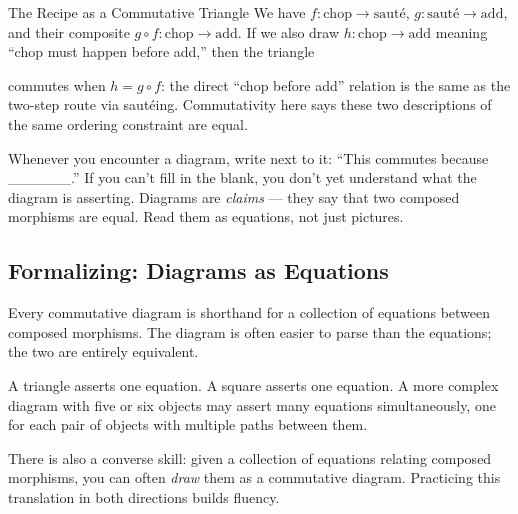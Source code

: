 \begin{example}{The Recipe as a Commutative Triangle}
We have $f : \text{chop} \to \text{sauté}$, $g : \text{sauté} \to \text{add}$,
and their composite $g \circ f : \text{chop} \to \text{add}$. If we also draw
$h : \text{chop} \to \text{add}$ meaning ``chop must happen before add,'' then
the triangle

\medskip
\begin{center}
\end{center}
\medskip

commutes when $h = g \circ f$: the direct ``chop before add'' relation is
the same as the two-step route via sautéing. Commutativity here says these two
descriptions of the same ordering constraint are equal.
\end{example}

\begin{readernote}
Whenever you encounter a diagram, write next to it: ``This commutes because
\_\_\_\_\_\_.'' If you can't fill in the blank, you don't yet understand what
the diagram is asserting. Diagrams are \emph{claims} --- they say that two
composed morphisms are equal. Read them as equations, not just pictures.
\end{readernote}

\subsection{Formalizing: Diagrams as Equations}

Every commutative diagram is shorthand for a collection of equations between
composed morphisms. The diagram is often easier to parse than the equations;
the two are entirely equivalent.

A triangle asserts one equation. A square asserts one equation. A more complex
diagram with five or six objects may assert many equations simultaneously, one
for each pair of objects with multiple paths between them.

There is also a converse skill: given a collection of equations relating
composed morphisms, you can often \emph{draw} them as a commutative diagram.
Practicing this translation in both directions builds fluency.

